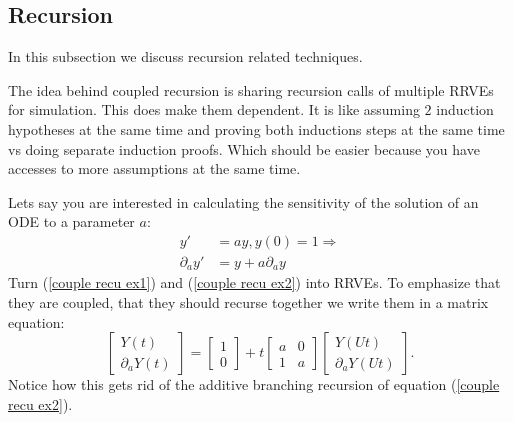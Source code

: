 \documentclass[a4paper,12pt]{article}
\begin{document}
\subsection{Recursion}
In this subsection we discuss recursion related techniques.

\begin{technique}
    The idea behind coupled recursion is sharing recursion calls of
    multiple RRVEs for simulation. This does make them dependent.
    It is like assuming $2$ induction hypotheses at the same
    time and proving both inductions steps at the same time vs
    doing separate induction proofs. Which should be easier
    because you have accesses to more assumptions at the same time.
\end{technique}

\begin{example}
    Lets say you are interested in calculating the
    sensitivity of the solution of an ODE to a
    parameter $a$:
    \begin{align}
        y'             & =ay,y(0)=1 \Rightarrow \label{couple recu ex1} \\
        \partial_{a}y' & = y + a \partial_{a}y \label{couple recu ex2}
    \end{align}
    Turn (\ref{couple recu ex1}) and (\ref{couple recu ex2}) into RRVEs.
    To emphasize that they are coupled, that they should
    recurse together we write them in a matrix equation:
    \begin{equation} \label{coupled mat}
        \begin{bmatrix}
            Y(t) \\
            \partial_{a}Y(t)
        \end{bmatrix}=
        \begin{bmatrix}
            1 \\
            0
        \end{bmatrix}+
        t \begin{bmatrix}
            a & 0 \\
            1 & a
        \end{bmatrix}
        \begin{bmatrix}
            Y(Ut) \\
            \partial_{a}Y(Ut)
        \end{bmatrix}.
    \end{equation}
    Notice how this gets rid of the additive branching
    recursion of equation (\ref{couple recu ex2}).

\end{example}
\end{document}
